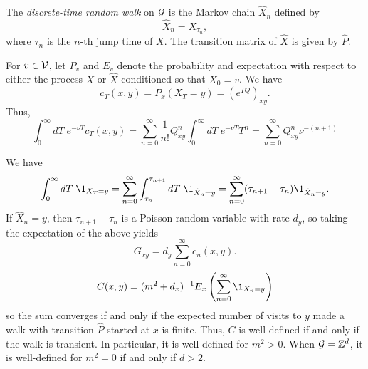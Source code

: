 The \emph{discrete-time random walk} on $\mathcal{G}$ is the Markov chain
$\hat X_n$ defined by
\begin{equation}
\hat X_n = X_{\tau_n},
\end{equation}
where $\tau_n$ is the $n$-th jump time of $X$. The transition matrix of
$\hat X$ is given by $\hat P$.

For $v \in \mathcal{V}$, let $P_v$ and $E_v$ denote the probability and expectation
with respect to either the process $X$ or $\hat X$ conditioned so that $X_0 = v$.
We have
\begin{equation}
c_T(x, y) = P_x (X_T = y) = (e^{T Q})_{xy}.
\end{equation}
Thus,
\begin{equation}
\int_0^\infty dT \; e^{-\nu T} c_T(x, y)
  =
\sum_{n=0}^\infty \frac{1}{n!} Q^n_{xy} \int_0^\infty dT \; e^{-\nu T} T^n
  =
\sum_{n=0}^\infty Q^n_{xy} \nu^{-(n+1)}
\end{equation}

\begin{example}
We have
\begin{equation}
\int_0^\infty dT \; \1_{X_T=y}
  =
\sum_{n=0}^\infty \int_{\tau_n}^{\tau_{n+1}} dT \; \1_{\hat X_n=y}
  =
\sum_{n=0}^\infty (\tau_{n+1} - \tau_n) \1_{\hat X_n=y}.
\end{equation}
If $\hat X_n = y$, then $\tau_{n+1} - \tau_n$ is a Poisson random variable with rate $d_y$,
so taking the expectation of the above yields
\begin{equation}
G_{xy} = d_y \sum_{n=0}^\infty c_n(x, y).
\end{equation}
\begin{equation}
C(x, y) = (m^2 + d_x)^{-1} E_x \left(\sum_{n=0}^\infty \1_{X_n=y} \right)
\end{equation}
so the sum converges if and only if the expected number of visits to $y$
made a walk with transition $\hat P$ started at $x$ is finite. Thus, $C$ is
well-defined if and only if the walk is transient.
In particular, it is well-defined for $m^2 > 0$. When $\mathcal{G} = { {{\mathbb Z}}^d }$, it is
well-defined for $m^2 = 0$ if and only if $d > 2$.
\end{example}

\begin{example}
\end{example}


